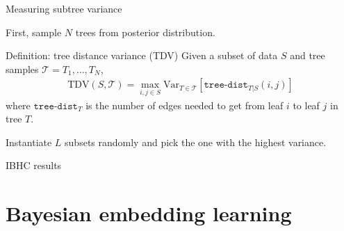 \documentclass[10pt, compress]{beamer}
\begin{document}
\begin{frame}{Measuring subtree variance}

    First, sample $N$ trees from posterior distribution.

  \pause

  \begin{block}{Definition: tree distance variance (TDV)}
    Given a subset of data $S$ and tree samples $\mathcal{T} = T_1, \ldots, T_N$,
    \begin{align}
      \mathrm{TDV}(S, \mathcal{T}) = \max_{i, j \in S}  \mathrm{Var}_{T \in \mathcal{T}}\left[\texttt{tree-dist}_{T|S}(i, j)\right]
    \end{align}
  where $\texttt{tree-dist}_T$ is the number of edges needed to get from leaf $i$ to leaf $j$
  in tree $T$.
  \end{block}

  \pause

Instantiate $L$ subsets randomly and pick the one with the highest variance.

\end{frame}
\fi

\begin{frame}{IBHC results}
  \centering
\end{frame}

\section{Bayesian embedding learning}
\end{document}
